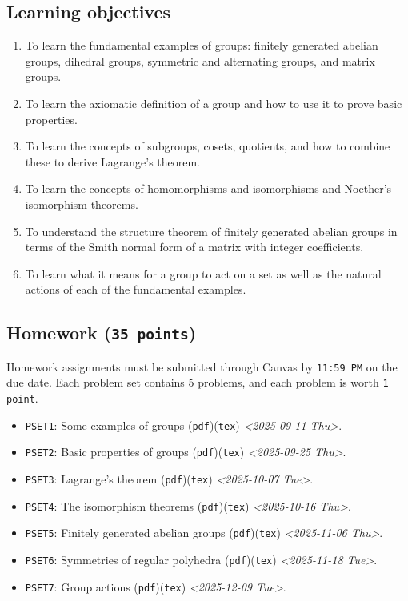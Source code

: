 \documentclass[11pt]{article}
\begin{document}
\subsection{Learning objectives}
\label{sec:orgeb96ddc}

\begin{enumerate}
\item To learn the fundamental examples of groups: finitely generated abelian
groups, dihedral groups, symmetric and alternating groups, and matrix
groups.
\item To learn the axiomatic definition of a group and how to use it to prove
basic properties.
\item To learn the concepts of subgroups, cosets, quotients, and how to combine
these to derive Lagrange’s theorem.
\item To learn the concepts of homomorphisms and isomorphisms and Noether's
isomorphism theorems.
\item To understand the structure theorem of finitely generated abelian groups in
terms of the Smith normal form of a matrix with integer coefficients.
\item To learn what it means for a group to act on a set as well as the
natural actions of each of the fundamental examples.
\end{enumerate}

\subsection{Homework (\texttt{35 points})}
\label{sec:orge5b883d}
Homework assignments must be submitted through Canvas by \texttt{11:59 PM} on the due
date. Each problem set contains 5 problems, and each problem is worth \texttt{1 point}.
\begin{itemize}
\item \texttt{PSET1}: Some examples of groups (\texttt{pdf})(\texttt{tex}) \textit{<2025-09-11 Thu>}.
\item \texttt{PSET2}: Basic properties of groups (\texttt{pdf})(\texttt{tex}) \textit{<2025-09-25 Thu>}.
\item \texttt{PSET3}: Lagrange's theorem (\texttt{pdf})(\texttt{tex}) \textit{<2025-10-07 Tue>}.
\item \texttt{PSET4}: The isomorphism theorems (\texttt{pdf})(\texttt{tex}) \textit{<2025-10-16 Thu>}.
\item \texttt{PSET5}: Finitely generated abelian groups (\texttt{pdf})(\texttt{tex}) \textit{<2025-11-06 Thu>}.
\item \texttt{PSET6}: Symmetries of regular polyhedra (\texttt{pdf})(\texttt{tex}) \textit{<2025-11-18 Tue>}.
\item \texttt{PSET7}: Group actions (\texttt{pdf})(\texttt{tex}) \textit{<2025-12-09 Tue>}.
\end{itemize}
\end{document}
